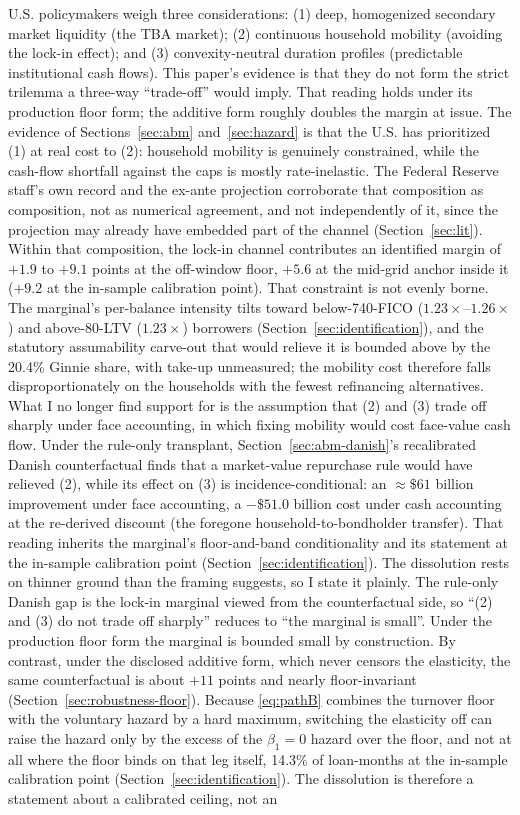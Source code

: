\documentclass[12pt]{article}
\begin{document}
U.S. policymakers weigh three considerations: (1) deep, homogenized secondary market liquidity (the TBA market); (2) continuous household mobility (avoiding the lock-in effect); and (3) convexity-neutral duration profiles (predictable institutional cash flows). This paper's evidence is that they do not form the strict trilemma a three-way ``trade-off'' would imply. That reading holds under its production floor form; the additive form roughly doubles the margin at issue. The evidence of Sections~\ref{sec:abm} and~\ref{sec:hazard} is that the U.S. has prioritized (1) at real cost to (2): household mobility is genuinely constrained, while the cash-flow shortfall against the caps is mostly rate-inelastic. The Federal Reserve staff's own record and the ex-ante projection corroborate that composition as composition, not as numerical agreement, and not independently of it, since the projection may already have embedded part of the channel (Section~\ref{sec:lit}). Within that composition, the lock-in channel contributes an identified margin of $+1.9$ to $+9.1$ points at the off-window floor, $+5.6$ at the mid-grid anchor inside it ($+9.2$ at the in-sample calibration point). That constraint is not evenly borne. The marginal's per-balance intensity tilts toward below-740-FICO ($1.23\times$--$1.26\times$) and above-80-LTV ($1.23\times$) borrowers (Section~\ref{sec:identification}), and the statutory assumability carve-out that would relieve it is bounded above by the 20.4\% Ginnie share, with take-up unmeasured; the mobility cost therefore falls disproportionately on the households with the fewest refinancing alternatives. What I no longer find support for is the assumption that (2) and (3) trade off sharply under face accounting, in which fixing mobility would cost face-value cash flow. Under the rule-only transplant, Section~\ref{sec:abm-danish}'s recalibrated Danish counterfactual finds that a market-value repurchase rule would have relieved (2), while its effect on (3) is incidence-conditional: an $\approx\$61$ billion improvement under face accounting, a $-\$51.0$ billion cost under cash accounting at the re-derived discount (the foregone household-to-bondholder transfer). That reading inherits the marginal's floor-and-band conditionality and its statement at the in-sample calibration point (Section~\ref{sec:identification}). The dissolution rests on thinner ground than the framing suggests, so I state it plainly. The rule-only Danish gap is the lock-in marginal viewed from the counterfactual side, so ``(2) and (3) do not trade off sharply'' reduces to ``the marginal is small''. Under the production floor form the marginal is bounded small by construction. By contrast, under the disclosed additive form, which never censors the elasticity, the same counterfactual is about $+11$ points and nearly floor-invariant (Section~\ref{sec:robustness-floor}). Because \eqref{eq:pathB} combines the turnover floor with the voluntary hazard by a hard maximum, switching the elasticity off can raise the hazard only by the excess of the $\beta_1 = 0$ hazard over the floor, and not at all where the floor binds on that leg itself, 14.3\% of loan-months at the in-sample calibration point (Section~\ref{sec:identification}). The dissolution is therefore a statement about a calibrated ceiling, not an 
\end{document}
